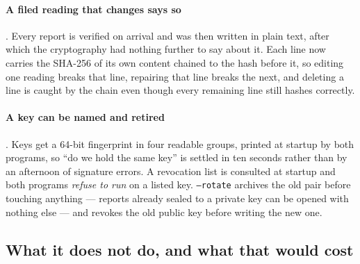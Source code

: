 \paragraph{A filed reading that changes says so}
. Every report is verified on arrival and
was then written in plain text, after which the cryptography had nothing
further to say about it. Each line now carries the SHA-256 of its own
content chained to the hash before it, so editing one reading breaks
that line, repairing that line breaks the next, and deleting a line is
caught by the chain even though every remaining line still hashes
correctly.

\paragraph{A key can be named and retired}
. Keys get a 64-bit fingerprint in four readable
groups, printed at startup by both programs, so ``do we hold the same
key'' is settled in ten seconds rather than by an afternoon of signature
errors. A revocation list is consulted at startup and both programs
\emph{refuse to run} on a listed key. \texttt{--rotate} archives the old
pair before touching anything --- reports already sealed to a private
key can be opened with nothing else --- and revokes the old public key
before writing the new one.

\subsection{What it does not do, and what that would cost}

